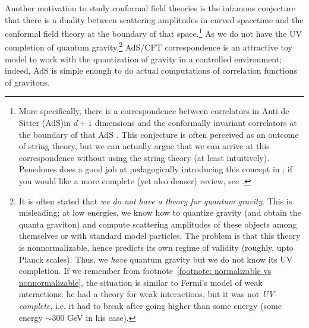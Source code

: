 Another motivation to study conformal field theories is the infamous conjecture that there is a duality between scattering amplitudes in curved spacetime and the conformal field theory at the boundary of that space.\footnote{
	More specifically, there is a correspondence between correlators in Anti de Sitter (AdS)\footnotemark in $d+1$ dimensions and the conformally invariant correlators at the boundary of that AdS \cite{Maldacena:1997re,Gubser:1998bc,Witten:1998qj}. This conjecture is often perceived as an outcome of string theory, but we can actually argue that we can arrive at this correspondence without using the string theory (at least intuitively). Penedones does a good job at pedagogically introducing this concept in \cite{Penedones:2016voo}; if you would like a more complete (yet also denser)  review, see \cite{Nastase:2007kj}.
}  As we do not have the UV completion of quantum gravity,\footnote{It is often stated that \emph{we do not have a theory for quantum gravity}. This is misleading; at low energies, we know how to quantize gravity (and obtain the quanta graviton) and compute scattering amplitudes of these objects among themselves or with standard model particles. The problem is that this theory is nonnormalizable, hence predicts its own regime of validity (roughly, upto Planck scales). Thus, we \emph{have} quantum gravity but we do not know its UV completion. If we remember from footnote~\ref{footnote: normalizable vs nonnormalizable}, the situation is similar to Fermi's model of weak interactions: he had a theory for weak interactions, but it was not \emph{UV-complete}, i.e. it had to break after going higher than some energy (some energy $\sim 300$ GeV in his case).} AdS/CFT correspondence is an attractive toy model to work with the quantization of gravity in a controlled environment; indeed, AdS is simple enough to do actual computations of correlation functions of gravitons.

